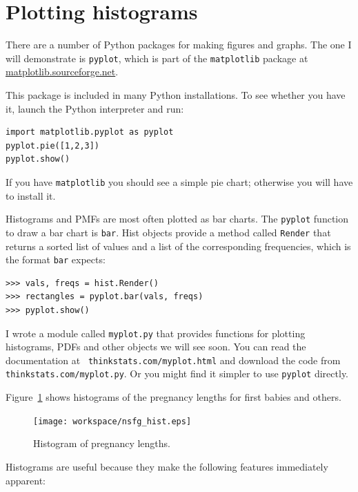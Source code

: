 \documentclass[12pt]{book}
\begin{document}
\section{Plotting histograms}

There are a number of Python packages for making figures and graphs.
The one I will demonstrate is {\tt pyplot}, which is part of
the {\tt matplotlib} package at \url{matplotlib.sourceforge.net}.

This package is included in many Python installations.  To see whether
you have it, launch the Python interpreter and run:

\begin{verbatim}
import matplotlib.pyplot as pyplot
pyplot.pie([1,2,3])
pyplot.show()
\end{verbatim}

If you have {\tt matplotlib} you should see a simple pie chart;
otherwise you will have to install it.

Histograms and PMFs are most often plotted as bar charts.  The
{\tt pyplot} function to draw a bar chart is {\tt bar}.  Hist
objects provide a method called {\tt Render} that returns a sorted
list of values and a list of the corresponding frequencies, which
is the format {\tt bar} expects:

\begin{verbatim}
>>> vals, freqs = hist.Render()
>>> rectangles = pyplot.bar(vals, freqs)
>>> pyplot.show()
\end{verbatim}

I wrote a module called {\tt myplot.py} that provides functions
for plotting histograms, PDFs and other objects we will see soon.
You can read the documentation at {\tt
  thinkstats.com/myplot.html} and download the code from {\tt
  thinkstats.com/myplot.py}.  Or you might find it simpler to use
{\tt pyplot} directly.

Figure~\ref{nsfg_hist} shows histograms of the pregnancy lengths for
first babies and others.

\begin{figure}
\centerline{\texttt{[image: workspace/nsfg\_hist.eps]}}
\caption{Histogram of pregnancy lengths.}
\label{nsfg_hist}
\end{figure}

Histograms are useful because they make the following features immediately
apparent:
\end{document}
